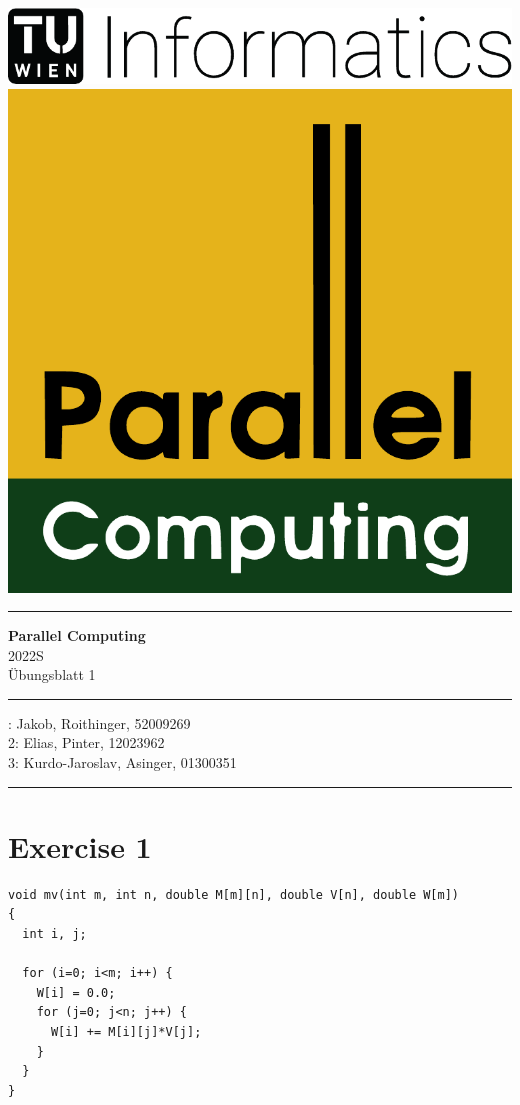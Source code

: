 \documentclass[a4paper,%
11pt,%
DIV=12,
headsepline,%
headings=normal,
]{scrartcl}
\newcounter{curex}
\newcommand{\exercise}[1]{\section*{Exercise #1}\setcounter{curex}{#1}}
\begin{document}
\noindent
\vspace*{1ex}
\begin{minipage}[t]{.45\linewidth}
\strut\vspace*{-\baselineskip}\newline
\includegraphics[height=.9cm]{./figs/Inf-Logo_black_en-eps-converted-to.pdf}
\includegraphics[height=.9cm]{./figs/par-logo}
\end{minipage}
\hfill
\begin{minipage}[t]{.5\linewidth}
\end{minipage}
\vspace*{1ex}

\hrule 

\vspace*{2ex}

\begin{center}
{\LARGE\textbf{Parallel Computing}}\\
{\large{}%
  2022S\\
  Übungsblatt 1\\
}
\end{center}

\hrule 
\vspace*{1ex}

: Jakob, Roithinger, 52009269\\
2: Elias, Pinter, 12023962\\
3: Kurdo-Jaroslav, Asinger, 01300351

\vspace*{1ex}
\hrule 

\exercise{1}

\begin{minipage}[t]{1.0\linewidth}
\begin{lstlisting}
void mv(int m, int n, double M[m][n], double V[n], double W[m])
{
  int i, j;

  for (i=0; i<m; i++) {
    W[i] = 0.0;
    for (j=0; j<n; j++) {
      W[i] += M[i][j]*V[j];
    }
  }
}
\end{lstlisting}
\end{minipage}
\end{document}
